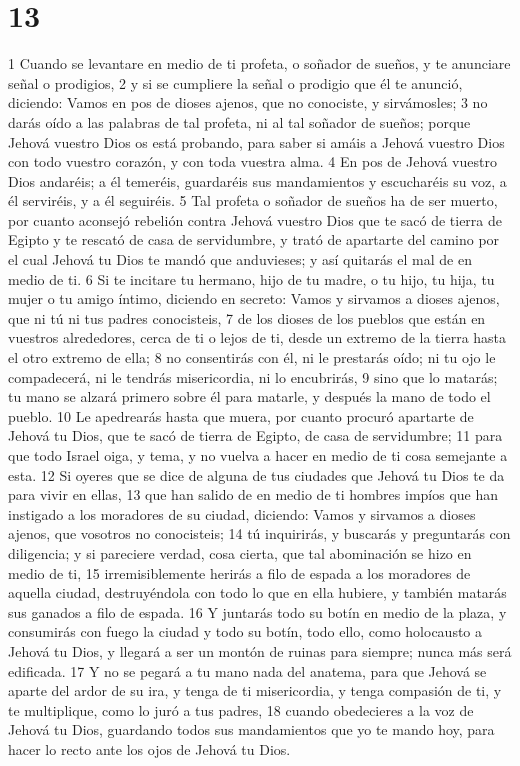 \chapter{13}


1 Cuando se levantare en medio de ti profeta, o soñador de sueños, y te anunciare señal o prodigios,
2 y si se cumpliere la señal o prodigio que él te anunció, diciendo: Vamos en pos de dioses ajenos, que no conociste, y sirvámosles;
3 no darás oído a las palabras de tal profeta, ni al tal soñador de sueños; porque Jehová vuestro Dios os está probando, para saber si amáis a Jehová vuestro Dios con todo vuestro corazón, y con toda vuestra alma.
4 En pos de Jehová vuestro Dios andaréis; a él temeréis, guardaréis sus mandamientos y escucharéis su voz, a él serviréis, y a él seguiréis.
5 Tal profeta o soñador de sueños ha de ser muerto, por cuanto aconsejó rebelión contra Jehová vuestro Dios que te sacó de tierra de Egipto y te rescató de casa de servidumbre, y trató de apartarte del camino por el cual Jehová tu Dios te mandó que anduvieses; y así quitarás el mal de en medio de ti.
6 Si te incitare tu hermano, hijo de tu madre, o tu hijo, tu hija, tu mujer o tu amigo íntimo, diciendo en secreto: Vamos y sirvamos a dioses ajenos, que ni tú ni tus padres conocisteis,
7 de los dioses de los pueblos que están en vuestros alrededores, cerca de ti o lejos de ti, desde un extremo de la tierra hasta el otro extremo de ella;
8 no consentirás con él, ni le prestarás oído; ni tu ojo le compadecerá, ni le tendrás misericordia, ni lo encubrirás,
9 sino que lo matarás; tu mano se alzará primero sobre él para matarle, y después la mano de todo el pueblo.
10 Le apedrearás hasta que muera, por cuanto procuró apartarte de Jehová tu Dios, que te sacó de tierra de Egipto, de casa de servidumbre;
11 para que todo Israel oiga, y tema, y no vuelva a hacer en medio de ti cosa semejante a esta.
12 Si oyeres que se dice de alguna de tus ciudades que Jehová tu Dios te da para vivir en ellas,
13 que han salido de en medio de ti hombres impíos que han instigado a los moradores de su ciudad, diciendo: Vamos y sirvamos a dioses ajenos, que vosotros no conocisteis;
14 tú inquirirás, y buscarás y preguntarás con diligencia; y si pareciere verdad, cosa cierta, que tal abominación se hizo en medio de ti,
15 irremisiblemente herirás a filo de espada a los moradores de aquella ciudad, destruyéndola con todo lo que en ella hubiere, y también matarás sus ganados a filo de espada.
16 Y juntarás todo su botín en medio de la plaza, y consumirás con fuego la ciudad y todo su botín, todo ello, como holocausto a Jehová tu Dios, y llegará a ser un montón de ruinas para siempre; nunca más será edificada.
17 Y no se pegará a tu mano nada del anatema, para que Jehová se aparte del ardor de su ira, y tenga de ti misericordia, y tenga compasión de ti, y te multiplique, como lo juró a tus padres,
18 cuando obedecieres a la voz de Jehová tu Dios, guardando todos sus mandamientos que yo te mando hoy, para hacer lo recto ante los ojos de Jehová tu Dios.

